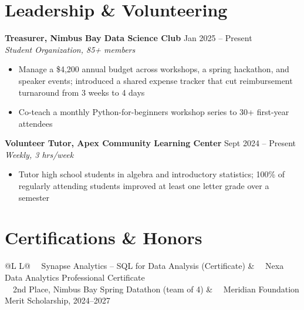 \documentclass[10pt,letterpaper]{article}
\newcommand{\rolehead}[3]{%
  \noindent\textbf{\color{inkNavy}#1} \hfill {\color{slateGray}\small #2}\\
  {\small\itshape\color{slateGray}#3}\par\vspace{2pt}
}
\begin{document}

\section{Leadership \& Volunteering}

\rolehead{Treasurer, Nimbus Bay Data Science Club}{Jan 2025 -- Present}{Student Organization, 85+ members}
\begin{itemize}
  \item Manage a \$4,200 annual budget across workshops, a spring hackathon, and speaker events;
        introduced a shared expense tracker that cut reimbursement turnaround from 3 weeks to 4 days
  \item Co-teach a monthly Python-for-beginners workshop series to 30+ first-year attendees
\end{itemize}

\rolehead{Volunteer Tutor, Apex Community Learning Center}{Sept 2024 -- Present}{Weekly, 3 hrs/week}
\begin{itemize}
  \item Tutor high school students in algebra and introductory statistics; 100\% of regularly
        attending students improved at least one letter grade over a semester
\end{itemize}


\section{Certifications \& Honors}
\begin{tabularx}{\linewidth}{@{}L L@{}}
\faCertificate\ \ Synapse Analytics -- SQL for Data Analysis (Certificate) & \faCertificate\ \ Nexa Data Analytics Professional Certificate \\[3pt]
\faTrophy\ \ 2nd Place, Nimbus Bay Spring Datathon (team of 4) & \faTrophy\ \ Meridian Foundation Merit Scholarship, 2024--2027 \\
\end{tabularx}
\end{document}
